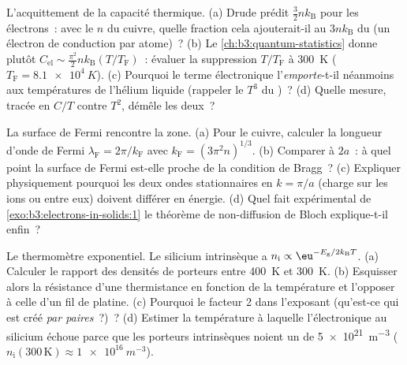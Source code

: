 \begin{exercise}[$\star\star$]\label{exo:b3:electrons-in-solids:6}
L'acquittement de la capacité thermique. (a) Drude prédit
$\tfrac32nk_{\text{B}}$ pour les électrons~: avec le $n$ du cuivre,
quelle fraction cela ajouterait-il au $3nk_{\text{B}}$ du  (un
électron de conduction par atome)~? (b)
Le \cref{ch:b3:quantum-statistics} donne plutôt $C_{\text{el}}
\sim \tfrac{\pi^2}{2}nk_{\text{B}}(T/T_{\text{F}})$~: évaluer la
suppression $T/T_{\text{F}}$ à \qty{300}{K}
($T_{\text{F}} = \qty{8.1e4}{K}$). (c) Pourquoi le terme électronique
l'\emph{emporte}-t-il néanmoins aux températures de l'hélium liquide
(rappeler le $T^3$ du )~? (d) Quelle mesure, tracée en
$C/T$ contre $T^2$, démêle les deux~?
\end{exercise}

\begin{exercise}[$\star\star$]\label{exo:b3:electrons-in-solids:7}
La surface de Fermi rencontre la zone. (a) Pour le cuivre, calculer
la longueur d'onde de Fermi
$\lambda_{\text{F}} = 2\pi/k_{\text{F}}$ avec
$k_{\text{F}} = (3\pi^2n)^{1/3}$. (b) Comparer à $2a$~: à quel point
la surface de Fermi est-elle proche de la condition de Bragg~? (c)
Expliquer physiquement pourquoi les deux ondes stationnaires en
$k = \pi/a$ (charge sur les ions ou entre eux) doivent différer en
énergie. (d) Quel fait expérimental de
\cref{exo:b3:electrons-in-solids:1} le théorème de non-diffusion de
Bloch explique-t-il enfin~?
\end{exercise}

\begin{exercise}[$\star\star$]\label{exo:b3:electrons-in-solids:8}
Le thermomètre exponentiel. Le silicium intrinsèque a $n_{\text{i}}
\propto \eu^{-E_{\text{g}}/2k_{\text{B}}T}$. (a) Calculer le rapport
des densités de porteurs entre \qty{400}{K} et \qty{300}{K}. (b)
Esquisser alors la résistance d'une thermistance en fonction de la
température et l'opposer à celle d'un fil de platine. (c) Pourquoi
le facteur 2 dans l'exposant (qu'est-ce qui est créé \emph{par
paires}~?)~? (d) Estimer la température à laquelle l'électronique au
silicium échoue parce que les porteurs intrinsèques noient un 
de \qty{5e21}{m^{-3}}
($n_{\text{i}}(300\,\text{K}) \approx \qty{1e16}{m^{-3}}$).
\end{exercise}

